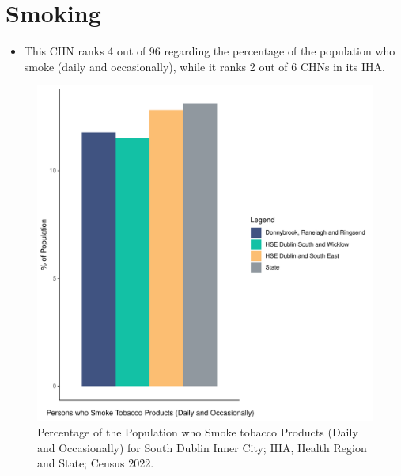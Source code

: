 \documentclass{article}
\begin{document}
\pagebreak

\section{Smoking}\label{sect:Smoking}
\begin{itemize}
\item This CHN ranks  4 out of 96 regarding the percentage of the population who smoke (daily and occasionally), while it ranks   2 out of 6 CHNs in its IHA.
\end{itemize}
\begin{figure}[H]
	\centering
	\includegraphics[width = 120mm]{../figures/SmokingED.pdf}
	\caption{Percentage of the Population who Smoke tobacco Products (Daily and Occasionally) for South Dublin Inner City; IHA, Health Region and State; Census 2022.}
	\label{fig:2ae19629-1a6a-13a3-e055-000000000001}
	\end{figure}
	
\end{document}
